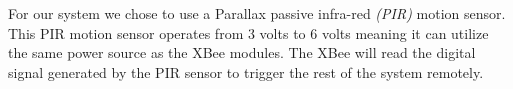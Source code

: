 \par For our system we chose to use a Parallax passive infra-red \textit{(PIR)} motion sensor. This PIR motion sensor operates from 3 volts to 6 volts meaning it can utilize the same power source as the XBee modules. The XBee will read the digital signal generated by the PIR sensor to trigger the rest of the system remotely.
